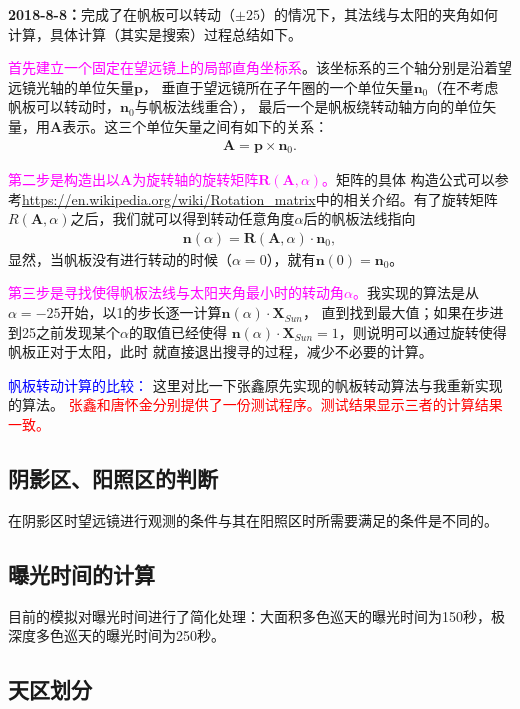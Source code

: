 \documentclass[a4paper,11pt]{ctexart}
\newcommand{\RT}[1]{\textcolor{red}{#1}}
\newcommand{\BT}[1]{\textcolor{blue}{#1}}
\newcommand{\MT}[1]{\textcolor{magenta}{#1}}
\begin{document}
\textbf{2018-8-8：}完成了在帆板可以转动（$\pm 25$\textdegree）的情况下，其法线与太阳的夹角如何
计算，具体计算（其实是搜索）过程总结如下。

\MT{\heiti 首先建立一个固定在望远镜上的局部直角坐标系}。该坐标系的三个轴分别是沿着望远镜光轴的单位矢量$\bm{p}$，
垂直于望远镜所在子午圈的一个单位矢量$\bm{n}_{0}$（在不考虑帆板可以转动时，$\bm{n}_{0}$与帆板法线重合），
最后一个是帆板绕转动轴方向的单位矢量，用$\bm{A}$表示。这三个单位矢量之间有如下的关系：
\begin{eqnarray}
\bm{A}=\bm{p}\times\bm{n}_{0}.
\end{eqnarray}

\MT{\heiti 第二步是构造出以$\bm{A}$为旋转轴的旋转矩阵$\bm{R}(\bm{A},\alpha)$。}矩阵的具体
构造公式可以参考\url{https://en.wikipedia.org/wiki/Rotation_matrix}中的相关介绍。有了旋转矩阵
$R(\bm{A},\alpha)$之后，我们就可以得到转动任意角度$\alpha$后的帆板法线指向
\begin{eqnarray}
\bm{n}(\alpha) = \bm{R}(\bm{A},\alpha)\cdot\bm{n}_{0},
\end{eqnarray}
显然，当帆板没有进行转动的时候（$\alpha=0$），就有$\bm{n}(0)=\bm{n}_{0}$。

\MT{\heiti 第三步是寻找使得帆板法线与太阳夹角最小时的转动角$\alpha$。}我实现的算法是从
$\alpha=-25$\textdegree 开始，以1\textdegree 的步长逐一计算$\bm{n}(\alpha)\cdot\bm{X}_{Sun}$，
直到找到最大值；如果在步进到25\textdegree 之前发现某个$\alpha$的取值已经使得
$\bm{n}(\alpha)\cdot\bm{X}_{Sun}=1$，则说明可以通过旋转使得帆板正对于太阳，此时
就直接退出搜寻的过程，减少不必要的计算。

\BT{\heiti 帆板转动计算的比较：}
这里对比一下张鑫原先实现的帆板转动算法与我重新实现的算法。
\RT{张鑫和唐怀金分别提供了一份测试程序。测试结果显示三者的计算结果一致。}


\subsection{阴影区、阳照区的判断}
在阴影区时望远镜进行观测的条件与其在阳照区时所需要满足的条件是不同的。

\subsection{曝光时间的计算}
目前的模拟对曝光时间进行了简化处理：大面积多色巡天的曝光时间为150秒，极深度多色巡天的曝光时间为250秒。


\subsection{天区划分}
\end{document}
